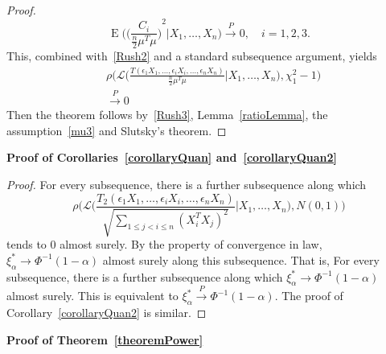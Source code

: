 \documentclass[smallcondensed,final,natbib]{svjour3}          %
\DeclareMathOperator{\myE}{E}
\begin{document}
\begin{proof}
    \begin{equation*}
    \myE\Big({\Big(\frac{C_i}{\frac{n}{2}\mu^T\mu}\Big)}^2\Big|X_1,\ldots,X_n\Big)\xrightarrow{P} 0,\quad i=1,2,3.
    \end{equation*}
    This, combined with~\eqref{Rush2} and a standard subsequence argument, yields
    \begin{equation}\label{Rush3}
        \begin{aligned}
            &\rho\Big(\mathcal{L}\Big(\frac{T(\epsilon_1 X_1,\ldots, \epsilon_i X_i,\ldots,\epsilon_n X_n)}{\frac{n}{2}\mu^T \mu}\Big| X_1,\ldots,X_n\Big),\chi^2_1-1\Big)\\
            &\xrightarrow{P} 0
        \end{aligned}
    \end{equation}
    Then the theorem follows by~\eqref{Rush3},  Lemma~\ref{ratioLemma}, the assumption~\eqref{mu3} and Slutsky's theorem.
\end{proof}

\textbf{\textbf{Proof of Corollaries~\ref{corollaryQuan} and~\ref{corollaryQuan2}}}

\begin{proof}
    For every subsequence, there is a further subsequence along which
    \begin{equation*}
        \rho\Big(\mathcal{L}\Big(\frac{T_2(\epsilon_1 X_1,\ldots, \epsilon_i X_i,\ldots,\epsilon_n X_n)}{\sqrt{\sum_{1\leq j<i\leq n}{(X_i^T X_j)}^2}}\Big|X_1,\ldots,X_n\Big),N(0,1)\Big)
    \end{equation*}
    tends to $0$ almost surely.
    By the property of convergence in law, $\xi^*_\alpha\to \Phi^{-1}(1-\alpha)$ almost surely along this subsequence.
    That is, For every subsequence, there is a further subsequence along which $\xi^*_\alpha\to \Phi^{-1}(1-\alpha)$ almost surely.
    This is equivalent to $\xi_{\alpha}^*  \xrightarrow{P}\Phi^{-1}(1-\alpha)$.
    The proof of Corollary~\ref{corollaryQuan2} is similar.

\end{proof}

\textbf{Proof of Theorem~\ref{theoremPower}}
\end{document}
